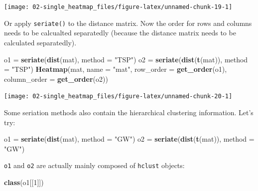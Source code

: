 \documentclass[]{book}
\newenvironment{Shaded}{\begin{snugshade}}{\end{snugshade}}
\newcommand{\KeywordTok}[1]{\textcolor[rgb]{0.13,0.29,0.53}{\textbf{#1}}}
\newcommand{\DataTypeTok}[1]{\textcolor[rgb]{0.13,0.29,0.53}{#1}}
\newcommand{\DecValTok}[1]{\textcolor[rgb]{0.00,0.00,0.81}{#1}}
\newcommand{\StringTok}[1]{\textcolor[rgb]{0.31,0.60,0.02}{#1}}
\newcommand{\NormalTok}[1]{#1}
\theoremstyle{definition}
\theoremstyle{definition}
\theoremstyle{definition}
\theoremstyle{remark}
\begin{document}
\begin{center}\texttt{[image: 02-single\_heatmap\_files/figure-latex/unnamed-chunk-19-1]} \end{center}

Or apply \texttt{seriate()} to the distance matrix. Now the order for
rows and columns needs to be calcualted separatedly (because the
distance matrix needs to be calculated separatedly).

\begin{Shaded}
\begin{Highlighting}[]
\NormalTok{o1 =}\StringTok{ }\KeywordTok{seriate}\NormalTok{(}\KeywordTok{dist}\NormalTok{(mat), }\DataTypeTok{method =} \StringTok{"TSP"}\NormalTok{)}
\NormalTok{o2 =}\StringTok{ }\KeywordTok{seriate}\NormalTok{(}\KeywordTok{dist}\NormalTok{(}\KeywordTok{t}\NormalTok{(mat)), }\DataTypeTok{method =} \StringTok{"TSP"}\NormalTok{)}
\KeywordTok{Heatmap}\NormalTok{(mat, }\DataTypeTok{name =} \StringTok{"mat"}\NormalTok{, }\DataTypeTok{row_order =} \KeywordTok{get_order}\NormalTok{(o1), }\DataTypeTok{column_order =} \KeywordTok{get_order}\NormalTok{(o2))}
\end{Highlighting}
\end{Shaded}

\begin{center}\texttt{[image: 02-single\_heatmap\_files/figure-latex/unnamed-chunk-20-1]} \end{center}

Some seriation methods also contain the hierarchical clustering
information. Let's try:

\begin{Shaded}
\begin{Highlighting}[]
\NormalTok{o1 =}\StringTok{ }\KeywordTok{seriate}\NormalTok{(}\KeywordTok{dist}\NormalTok{(mat), }\DataTypeTok{method =} \StringTok{"GW"}\NormalTok{)}
\NormalTok{o2 =}\StringTok{ }\KeywordTok{seriate}\NormalTok{(}\KeywordTok{dist}\NormalTok{(}\KeywordTok{t}\NormalTok{(mat)), }\DataTypeTok{method =} \StringTok{"GW"}\NormalTok{)}
\end{Highlighting}
\end{Shaded}

\texttt{o1} and \texttt{o2} are actually mainly composed of
\texttt{hclust} objects:

\begin{Shaded}
\begin{Highlighting}[]
\KeywordTok{class}\NormalTok{(o1[[}\DecValTok{1}\NormalTok{]])}
\end{Highlighting}
\end{Shaded}
\end{document}
